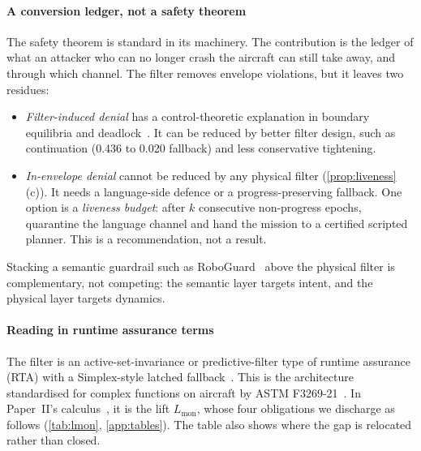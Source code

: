\paragraph{A conversion ledger, not a safety theorem} The safety theorem is
standard in its machinery. The contribution is the ledger of what an
attacker who can no longer crash the aircraft can still take away, and
through which channel. The filter removes envelope violations, but it
leaves two residues:
\begin{itemize}
\item \emph{Filter-induced denial} has a control-theoretic explanation in
  boundary equilibria and deadlock~\cite{reis2021undesired,grover2020deadlock}.
  It can be reduced by better filter design, such as continuation (0.436 to
  0.020 fallback) and less conservative tightening.
\item \emph{In-envelope denial} cannot be reduced by any physical filter
  (\cref{prop:liveness}(c)). It needs a language-side defence or a
  progress-preserving fallback. One option is a \emph{liveness budget}:
  after $k$ consecutive non-progress epochs, quarantine the language channel
  and hand the mission to a certified scripted planner. This is a
  recommendation, not a result.
\end{itemize}
Stacking a semantic guardrail such as RoboGuard~\cite{ravichandran2026roboguard}
above the physical filter is complementary, not competing: the semantic
layer targets intent, and the physical layer targets dynamics.

\paragraph{Reading in runtime assurance terms} The filter is an
active-set-invariance or predictive-filter type of runtime assurance (RTA)
with a Simplex-style latched
fallback~\cite{hobbs2023rta,gurriet2018online,mehmood2022bbsimplex}. This
is the architecture standardised for complex functions on aircraft by ASTM
F3269-21~\cite{astm2021f3269}. In Paper~II's calculus~\cite{paperII}, it is
the lift $L_{\mathrm{mon}}$, whose four obligations we discharge as follows
(\cref{tab:lmon}, \cref{app:tables}). The table also shows where the gap is relocated rather
than closed.



